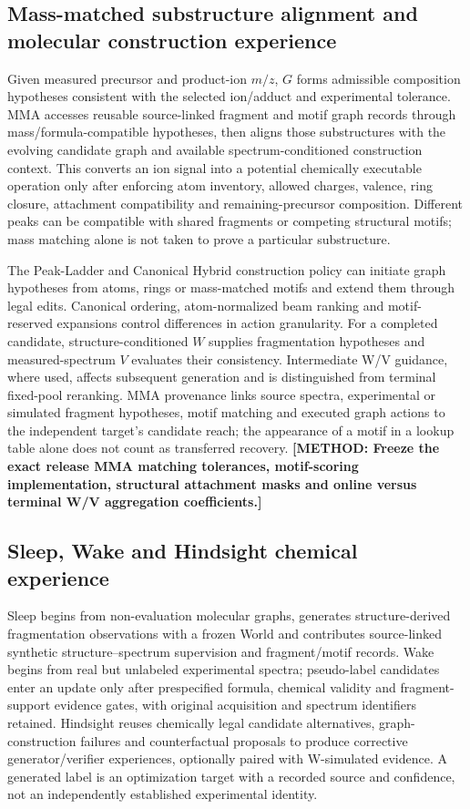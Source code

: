 \documentclass[11pt]{article}
\newcommand{\methodtodo}[1]{\textbf{\textcolor{orbitviolet}{[METHOD: #1]}}}
\begin{document}
\subsection*{Mass-matched substructure alignment and molecular construction experience}
Given measured precursor and product-ion \(m/z\), \(G\) forms admissible composition hypotheses consistent with the selected ion/adduct and experimental tolerance. MMA accesses reusable source-linked fragment and motif graph records through mass/formula-compatible hypotheses, then aligns those substructures with the evolving candidate graph and available spectrum-conditioned construction context. This converts an ion signal into a potential chemically executable operation only after enforcing atom inventory, allowed charges, valence, ring closure, attachment compatibility and remaining-precursor composition. Different peaks can be compatible with shared fragments or competing structural motifs; mass matching alone is not taken to prove a particular substructure.

The Peak-Ladder and Canonical Hybrid construction policy can initiate graph hypotheses from atoms, rings or mass-matched motifs and extend them through legal edits. Canonical ordering, atom-normalized beam ranking and motif-reserved expansions control differences in action granularity. For a completed candidate, structure-conditioned \(W\) supplies fragmentation hypotheses and measured-spectrum \(V\) evaluates their consistency. Intermediate W/V guidance, where used, affects subsequent generation and is distinguished from terminal fixed-pool reranking. MMA provenance links source spectra, experimental or simulated fragment hypotheses, motif matching and executed graph actions to the independent target's candidate reach; the appearance of a motif in a lookup table alone does not count as transferred recovery. \methodtodo{Freeze the exact release MMA matching tolerances, motif-scoring implementation, structural attachment masks and online versus terminal W/V aggregation coefficients.}

\subsection*{Sleep, Wake and Hindsight chemical experience}
Sleep begins from non-evaluation molecular graphs, generates structure-derived fragmentation observations with a frozen World and contributes source-linked synthetic structure--spectrum supervision and fragment/motif records. Wake begins from real but unlabeled experimental spectra; pseudo-label candidates enter an update only after prespecified formula, chemical validity and fragment-support evidence gates, with original acquisition and spectrum identifiers retained. Hindsight reuses chemically legal candidate alternatives, graph-construction failures and counterfactual proposals to produce corrective generator/verifier experiences, optionally paired with W-simulated evidence. A generated label is an optimization target with a recorded source and confidence, not an independently established experimental identity.
\end{document}
